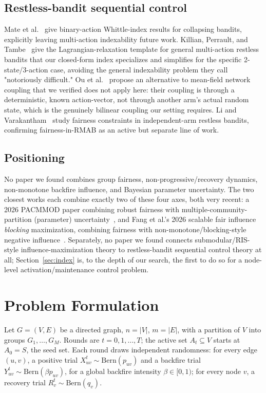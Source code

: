 \documentclass[journal]{IEEEtran}
\begin{document}
\subsection{Restless-bandit sequential control}
Mate et al.~\cite{mate2020collapsing} give binary-action Whittle-index
results for collapsing bandits, explicitly leaving multi-action indexability
future work. Killian, Perrault, and Tambe~\cite{killian2021beyond} give the
Lagrangian-relaxation template for general multi-action restless bandits that
our closed-form index specializes and simplifies for the specific 2-state/3-action
case, avoiding the general indexability problem they call "notoriously
difficult." Ou et al.~\cite{ou2022networked} propose an alternative to
mean-field network coupling that we verified does not apply here: their
coupling is through a deterministic, known action-vector, not through
another arm's actual random state, which is the genuinely bilinear coupling
our setting requires. Li and Varakantham~\cite{li2022efficient} study
fairness constraints in independent-arm restless bandits, confirming
fairness-in-RMAB as an active but separate line of work.

\subsection{Positioning}
No paper we found combines group fairness, non-progressive/recovery
dynamics, non-monotone backfire influence, and Bayesian parameter
uncertainty. The two closest works each combine exactly two of these four
axes, both very recent: a 2026 PACMMOD paper combining robust fairness with
multiple-community-partition (parameter) uncertainty~\cite{robustfair2026pacmmod},
and Fang et al.'s 2026 scalable fair influence \emph{blocking} maximization,
combining fairness with non-monotone/blocking-style negative
influence~\cite{fang2026scalable}. Separately, no paper we found connects
submodular/RIS-style influence-maximization theory to restless-bandit
sequential control theory at all; Section~\ref{sec:index} is, to the depth
of our search, the first to do so for a node-level activation/maintenance
control problem.

\section{Problem Formulation}
\label{sec:model}

Let $G=(V,E)$ be a directed graph, $n=|V|$, $m=|E|$, with a partition of $V$
into groups $G_1,\dots,G_M$. Rounds are $t=0,1,\dots,T$; the active set
$A_t\subseteq V$ starts at $A_0=S$, the seed set. Each round draws
independent randomness: for every edge $(u,v)$, a positive trial
$X^t_{uv}\sim\mathrm{Bern}(p_{uv})$ and a backfire trial
$Y^t_{uv}\sim\mathrm{Bern}(\beta p_{uv})$, for a global backfire intensity
$\beta\in[0,1)$; for every node $v$, a recovery trial
$R^t_v\sim\mathrm{Bern}(q_v)$.
\end{document}
